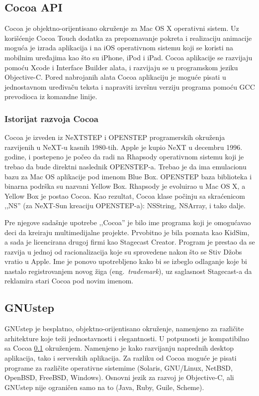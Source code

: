 \documentclass[a4paper]{article}
\begin{document}
{\subsection{Cocoa API}
\label{sec:Cocoa}
Cocoa \cite{cocoa} je objektno-orijentisano okruženje za Mac OS X operativni sistem. Uz korišćenje Cocoa Touch dodatka za
prepoznavanje pokreta i realizaciju animacije moguća je izrada aplikacija i na iOS operativnom
sistemu koji se koristi na mobilnim uređajima kao što su iPhone, iPod i iPad.
Cocoa aplikacije se
razvijaju pomoću Xcode i Interface Builder alata, i razvijaju se u programskom jeziku Objective-C.
Pored nabrojanih alata Cocoa aplikaciju je moguće pisati u jednostavnom uređivaču teksta i
napraviti izvršnu verziju programa pomoću GCC prevodioca iz komandne linije.

\subsubsection{Istorijat razvoja Cocoa}
Cocoa je izveden iz NeXTSTEP i OPENSTEP programerskih okruženja razvijenih u NeXT-u kasnih 1980-tih. Apple je kupio NeXT u decembru 1996. godine, i postepeno je počeo da radi na Rhapsody operativnom sistemu koji je trebao da bude direktni naslednik OPENSTEP-a. Trebao je da ima emulacionu bazu za Mac OS aplikacije pod imenom Blue Box. OPENSTEP baza biblioteka i binarna podrška su nazvani Yellow Box. Rhapsody je evoluirao u Mac OS X, a Yellow Box je postao Cocoa. Kao rezultat, Cocoa klase počinju sa skraćenicom ,,NS'' (za NeXT-Sun kreaciju OPENSTEP-a): NSString, NSArray, i tako dalje.


Pre njegove sadašnje upotrebe ,,Cocoa'' je bilo ime programa koji je omogućavao deci da kreiraju multimedijalne projekte. Prvobitno je bila poznata kao KidSim, a sada je licencirana drugoj firmi kao Stagecast Creator. Program je prestao da se razvija u jednoj od racionalizacija koje su sprovedene nakon što se Stiv Džobs vratio u Apple. Ime je ponovo upotrebljeno kako bi se izbeglo odlaganje koje bi nastalo registrovanjem novog žiga (eng.~{\em trademark}), uz saglasnost Stagecast-a da reklamira stari Cocoa pod novim imenom.


\subsection{GNUstep}
\label{GNUstep}
GNUstep \cite{objectivecandgnustep} je besplatno, objektno-orijentisano okruženje, namenjeno za različite arhitekture koje teži jednostavnosti i elegantnosti. U potpunosti je kompatibilno sa Cocoa \ref{sec:Cocoa} okruženjem. Namenjeno je kako razvijanju naprednih desktop aplikacija, tako i serverskih aplikacija. Za razliku od Cocoa moguće je pisati programe za različite operativne sistemime (Solaris, GNU/Linux, NetBSD, OpenBSD, FreeBSD, Windows). 
Osnovni jezik za razvoj je Objective-C, ali GNUstep nije ograničen samo na to (Java, Ruby, Guile, Scheme).

}
\end{document}
